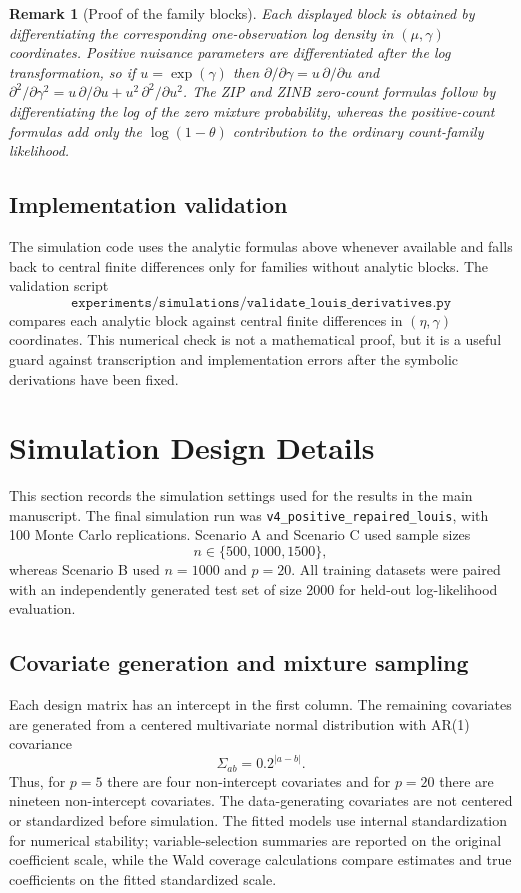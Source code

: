 \documentclass{article}
\newtheorem{remark}{Remark}
\begin{document}
\begin{remark}[Proof of the family blocks]
Each displayed block is obtained by differentiating the corresponding
one-observation log density in $(\mu,\gamma)$ coordinates.  Positive nuisance
parameters are differentiated after the log transformation, so if
$u=\exp(\gamma)$ then
$\partial/\partial\gamma=u\,\partial/\partial u$ and
$\partial^2/\partial\gamma^2
=u\,\partial/\partial u+u^2\,\partial^2/\partial u^2$.  The ZIP and ZINB
zero-count formulas follow by differentiating the log of the zero mixture
probability, whereas the positive-count formulas add only the
$\log(1-\theta)$ contribution to the ordinary count-family likelihood.
\end{remark}

\subsection{Implementation validation}

The simulation code uses the analytic formulas above whenever available and
falls back to central finite differences only for families without analytic
blocks.  The validation script
\[
    \texttt{experiments/simulations/validate\_louis\_derivatives.py}
\]
compares each analytic block against central finite differences in
$(\eta,\gamma)$ coordinates.  This numerical check is not a mathematical proof,
but it is a useful guard against transcription and implementation errors after
the symbolic derivations have been fixed.

\section{Simulation Design Details}
\label{sec:supp_sim_design}

This section records the simulation settings used for the results in the main
manuscript.  The final simulation run was
\texttt{v4\_positive\_repaired\_louis}, with 100 Monte Carlo replications.
Scenario A and Scenario C used sample sizes
\[
    n\in\{500,1000,1500\},
\]
whereas Scenario B used \(n=1000\) and \(p=20\).  All training datasets were
paired with an independently generated test set of size 2000 for held-out
log-likelihood evaluation.

\subsection{Covariate generation and mixture sampling}

Each design matrix has an intercept in the first column.  The remaining
covariates are generated from a centered multivariate normal distribution with
AR(1) covariance
\[
    \Sigma_{ab}=0.2^{|a-b|}.
\]
Thus, for \(p=5\) there are four non-intercept covariates and for \(p=20\)
there are nineteen non-intercept covariates.  The data-generating covariates are
not centered or standardized before simulation.  The fitted models use internal
standardization for numerical stability; variable-selection summaries are
reported on the original coefficient scale, while the Wald coverage calculations
compare estimates and true coefficients on the fitted standardized scale.
\end{document}
